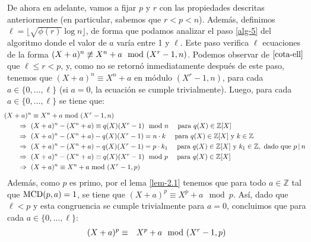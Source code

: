                 De ahora en adelante, vamos a fijar $p$ y $r$ con las propiedades descritas anteriormente (en particular, sabemos que $r < p < n$). Además, definimos $\ell=\lfloor \sqrt{\phi(r)}\log  n\rfloor$, de forma que podamos analizar el paso \ref{alg-5} del algoritmo donde el valor de $a$ varía entre 1 y $\ell$. Este paso 
	verifica $\ell$ ecuaciones de la forma $(X+a)^n \not\equiv X^n+a \mod(X^r-1,n)$.
	Podemos observar de $\eqref{cota-ell}$ que $\ell \leq r < p$, y, como no se retornó inmediatamente después de este paso, tenemos que $(X+a)^n\equiv X^n+a$ en módulo $(X^r -1,n)$, para  cada $a \in \{0, \ldots, \ell\}$ (si $a=0$, la ecuación se cumple trivialmente). Luego, para cada $a \in \{0, \ldots, \ell\}$ se tiene que:
	\begin{align}
		&\hspace{-5pt}(X+a)^n\equiv X^n+a \!\!\mod(X^r-1,n) \nonumber\\
&\hspace{15pt}\Rightarrow\ (X+a)^n - (X^n+a) \equiv q(X)(X^r-1) \mod n \quad \text{ para } q(X)\in \mathbb{Z}[X]  \nonumber\\ 
&\hspace{15pt}\Rightarrow\ (X+a)^n - (X^n+a) -q(X)(X^r-1)= n\cdot k \quad \text{ para } q(X)\in \mathbb{Z}[X]  \text{ y } k \in \mathbb{Z} \nonumber\\
&\hspace{15pt}\Rightarrow\ (X+a)^n - (X^n+a) -q(X)(X^r-1)= p\cdot k_1 \quad \text{ para } q(X)\in \mathbb{Z}[X]  \text{ y } k_1 \in \mathbb{Z}, \text{ dado que } p \hspace{1.8pt}|\hspace{1.8pt} n \nonumber\\
&\hspace{15pt}\Rightarrow\ (X+a)^n - (X^n+a) \equiv q(X)(X^r-1) \mod p \quad \text{ para } q(X)\in \mathbb{Z}[X]  \nonumber\\ 
&\hspace{15pt}\Rightarrow\ (X+a)^n\equiv X^n+a \!\!\mod (X^r-1,p) \label{eq:7}
\end{align}
	Además, como $p$ es primo, 
	por el lema \ref{lem-2.1} tenemos que para todo $a \in \mathbb{Z}$ tal que ${\rm MCD}(p,a)=1$, se tiene que $(X+a)^p \equiv X^p+a \mod p$. Así, dado que $\ell < p$ y esta congruencia se cumple trivialmente para $a = 0$, concluimos que para cada $a \in \{0, \ldots, \ell\}$:
	\begin{eqnarray}
		(X+a)^p&\equiv & X^p+a \mod (X^r-1,p) \label{eq:8}		
	\end{eqnarray}
